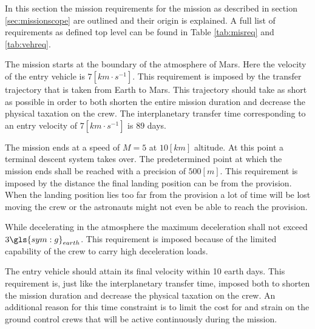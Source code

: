 In this section the mission requirements for the mission as described in section \ref{sec:missionscope} are outlined and their origin is explained. A full list of requirements as defined top level can be found in Table \ref{tab:misreq} and \ref{tab:vehreq}.

The mission starts at the boundary of the atmosphere of Mars. Here the velocity of the entry vehicle is $7 \left[km \cdot s^{-1} \right]$. This requirement is imposed by the transfer trajectory that is taken from Earth to Mars. This trajectory should take as short as possible in order to both shorten the entire mission duration and decrease the physical taxation on the crew. The interplanetary transfer time corresponding to an entry velocity of $7 \left[km \cdot s^{-1} \right]$ is $89$ days. 

The mission ends at a speed of $M=5$ at $10 \left[km\right]$ altitude. At this point a terminal descent system takes over. The predetermined point at which the mission ends shall be reached with a precision of $500 \left[m\right]$. This requirement is imposed by the distance the final landing position can be from the provision. When the landing position lies too far from the provision a lot of time will be lost moving the crew or the astronauts might not even be able to reach the provision.

While decelerating in the atmosphere the maximum deceleration shall not exceed $3\gls{sym:g}_{earth}$. This requirement is imposed because of the limited capability of the crew to carry high deceleration loads.

The entry vehicle should attain its final velocity within 10 earth days. This requirement is, just like the interplanetary transfer time, imposed both to shorten the mission duration and decrease the physical taxation on the crew. An additional reason for this time constraint is to limit the cost for and strain on the ground control crews that will be active continuously during the mission.


